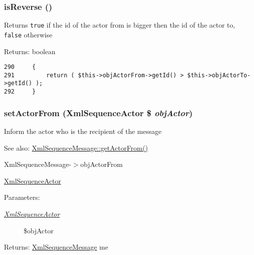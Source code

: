 \hypertarget{class_xml_sequence_message_ce0d3717d6009009afd211ae37fbaea5}{
\subsubsection[{isReverse}]{\setlength{\rightskip}{0pt plus 5cm}isReverse ()}}
\label{class_xml_sequence_message_ce0d3717d6009009afd211ae37fbaea5}


Returns {\tt true} if the id of the actor from is bigger then the id of the actor to, {\tt false} otherwise

\begin{Desc}
\item[Returns:]boolean \end{Desc}


\begin{Code}\begin{verbatim}290     {
291         return ( $this->objActorFrom->getId() > $this->objActorTo->getId() );
292     }
\end{verbatim}
\end{Code}


\hypertarget{class_xml_sequence_message_e2d39ea366f732a74b73c05ed3d1fbb5}{
\subsubsection[{setActorFrom}]{\setlength{\rightskip}{0pt plus 5cm}setActorFrom ({\bf XmlSequenceActor} \$ {\em objActor})}}
\label{class_xml_sequence_message_e2d39ea366f732a74b73c05ed3d1fbb5}


Inform the actor who is the recipient of the message

\begin{Desc}
\item[See also:]\hyperlink{class_xml_sequence_message_246c4363396d243058a9decdba3c7851}{XmlSequenceMessage::getActorFrom()} 

XmlSequenceMessage-$>$objActorFrom 

\hyperlink{class_xml_sequence_actor}{XmlSequenceActor} \end{Desc}
\begin{Desc}
\item[Parameters:]
\begin{description}
\item[{\em \hyperlink{class_xml_sequence_actor}{XmlSequenceActor}}]\$objActor \end{description}
\end{Desc}
\begin{Desc}
\item[Returns:]\hyperlink{class_xml_sequence_message}{XmlSequenceMessage} me \end{Desc}


